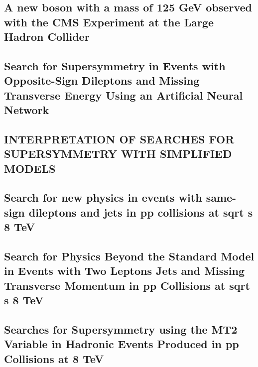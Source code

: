 \documentclass[a4paper, 11pt, twoside, openright]{report}
\begin{document}
\subsection{A new boson with a mass of 125 GeV observed with the CMS Experiment at the Large Hadron Collider}


\subsection{Search for Supersymmetry in Events with Opposite-Sign Dileptons and Missing Transverse Energy Using an Artificial Neural Network}


\subsection{INTERPRETATION OF SEARCHES FOR SUPERSYMMETRY WITH SIMPLIFIED MODELS}


\subsection{Search for new physics in events with same-sign dileptons and jets in pp collisions at sqrt s 8 TeV}


\subsection{Search for Physics Beyond the Standard Model in Events with Two Leptons Jets and Missing Transverse Momentum in pp Collisions at sqrt s 8 TeV}


\subsection{Searches for Supersymmetry using the MT2 Variable in Hadronic Events Produced in pp Collisions at 8 TeV}

\end{document}
